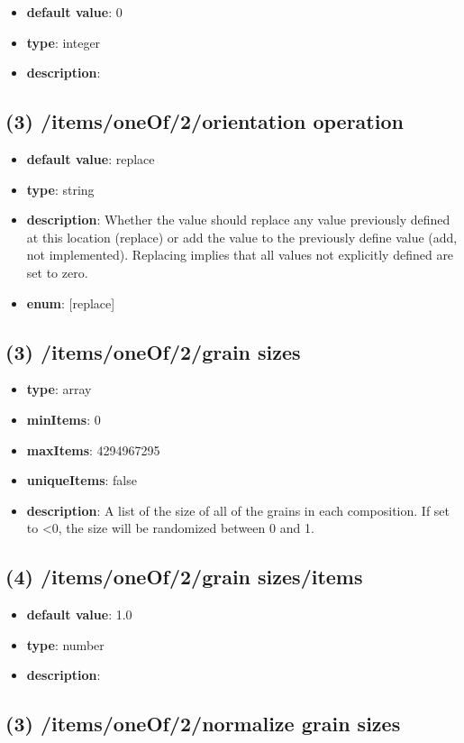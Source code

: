 \begin{itemize}[leftmargin=4em]\item {\bf default value}: 0
\item {\bf type}: integer
\item {\bf description}: 
\end{itemize}\subsection{(3) /items/oneOf/2/orientation operation}
\begin{itemize}[leftmargin=3em]\item {\bf default value}: replace
\item {\bf type}: string
\item {\bf description}: Whether the value should replace any value previously defined at this location (replace) or add the value to the previously define value (add, not implemented). Replacing implies that all values not explicitly defined are set to zero.
\item {\bf enum}: [replace]\end{itemize}\subsection{(3) /items/oneOf/2/grain sizes}
\begin{itemize}[leftmargin=3em]\item {\bf type}: array
\item {\bf minItems}: 0
\item {\bf maxItems}: 4294967295
\item {\bf uniqueItems}: false
\item {\bf description}: A list of the size of all of the grains in each composition. If set to <0, the size will be randomized between 0 and 1.
\end{itemize}\subsection{(4) /items/oneOf/2/grain sizes/items}
\begin{itemize}[leftmargin=4em]\item {\bf default value}: 1.0
\item {\bf type}: number
\item {\bf description}: 
\end{itemize}\subsection{(3) /items/oneOf/2/normalize grain sizes}
